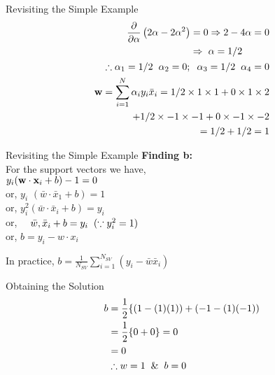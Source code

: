 \documentclass{beamer}
\begin{document}
\begin{frame}{Revisiting the Simple Example}
\begin{align*}
\begin{aligned}
\frac{\partial}{\partial \alpha}\left(2 \alpha- 2\alpha^{2}\right)=0 & \Rightarrow 2-4 \alpha=0 \\
\Rightarrow \hspace{2mm}& \alpha=1/2\\
\end{aligned}\\
\therefore \alpha_{1}=1/2 \hspace{2mm} \alpha_{2}=0 ; \hspace{2mm} \alpha_{3}=1/2 \hspace{2mm} \alpha_{4}=0
\\
\mathbf{w}=\sum_{i=1}^{N} \alpha_{i} y_{i} \bar{x}_{i} =1/2 \times 1 \times 1+0 \times 1 \times 2 \\
+ 1/2 \times -1 \times -1 + 0\times -1 \times -2 \\
 = 1/2 + 1/2 = 1
\end{align*}
\end{frame}

\begin{frame}{Revisiting the Simple Example}
\textbf{Finding b:}\\
For the support vectors we have, \\

$y_{i}(\mathbf{w} \cdot \mathbf{x}_{i}+b)-1=0$\\
or, $y_{i}$ $\left(\bar{w} \cdot \bar{x}_{1}+b\right)=1$\\
or, $y_{i}^{2}\left(\bar{w} \cdot \bar{x}_{i}+b\right)=y_{i}$\\
or, $\quad \bar{w}, \bar{x}_{i}+b=y_{i} \hspace{2mm}(\because y_{i}^{2} = 1)$\\
or, $b= y_i - w \cdot x_i$

In practice, $b=\frac{1}{N_{SV}} \sum_{i=1}^{N_{SV}}\left(y_{i}-\bar{w}\bar{x}_{i}\right)$

\end{frame}

\begin{frame}{Obtaining the Solution}
\begin{align*}
\begin{aligned}
b &=\frac{1}{2}\{(1-(1)(1))+(-1-(1)(-1))\\
&=\frac{1}{2}\{0+0\}=0 \\
&=0 \\
& \therefore w = 1 \hspace{2mm}\& \hspace{2mm} b = 0
\end{aligned}
\end{align*}
\end{frame}
\end{document}
